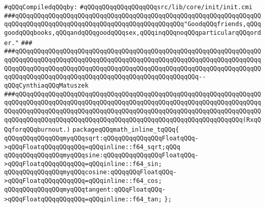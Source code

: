 \label{src/lib/core/init/math-built-in-intel32.pkg}
\newline
\verb|#qQQqCompiledqQQqby:|\newline
\verb|#qQQqqQQqqQQqqQQqqQQqsrc/lib/core/init/init.cmi|\newline
\newline
\newline
\newline
\verb|###qQQqqQQqqQQqqQQqqQQqqQQqqQQqqQQqqQQqqQQqqQQqqQQqqQQqqQQqqQQqqQQqqQQqqQQqqQQqqQQqqQQqqQQqqQQqqQQqqQQqqQQqqQQqqQQqqQQq"GoodqQQqfriends,qQQqgoodqQQqbooks,qQQqandqQQqgoodqQQqsex,qQQqinqQQqnoqQQqparticularqQQqorder."|\newline
\verb|###|\newline
\verb|###qQQqqQQqqQQqqQQqqQQqqQQqqQQqqQQqqQQqqQQqqQQqqQQqqQQqqQQqqQQqqQQqqQQqqQQqqQQqqQQqqQQqqQQqqQQqqQQqqQQqqQQqqQQqqQQqqQQqqQQqqQQqqQQqqQQqqQQqqQQqqQQqqQQqqQQqqQQqqQQqqQQqqQQqqQQqqQQqqQQqqQQqqQQqqQQqqQQqqQQqqQQqqQQqqQQqqQQqqQQqqQQqqQQqqQQqqQQqqQQqqQQqqQQqqQQqqQQqqQQq--qQQqCynthiaqQQqMatuszek|\newline
\verb|###qQQqqQQqqQQqqQQqqQQqqQQqqQQqqQQqqQQqqQQqqQQqqQQqqQQqqQQqqQQqqQQqqQQqqQQqqQQqqQQqqQQqqQQqqQQqqQQqqQQqqQQqqQQqqQQqqQQqqQQqqQQqqQQqqQQqqQQqqQQqqQQqqQQqqQQqqQQqqQQqqQQqqQQqqQQqqQQqqQQqqQQqqQQqqQQqqQQqqQQqqQQqqQQqqQQqqQQqqQQqqQQqqQQqqQQqqQQqqQQqqQQqqQQqqQQqqQQqqQQqqQQqqQQqqQQq(RxqQQqforqQQqburnout.)|\newline
\newline
\newline
\newline
\verb|packageqQQqmath_inline_tqQQq{|\newline
\newline
\verb|qQQqqQQqqQQqqQQqmyqQQqsqrt:qQQqqQQqqQQqqQQqFloatqQQq->qQQqFloatqQQqqQQqqQQq=qQQqinline::f64_sqrt;qQQq|\newline
\verb|qQQqqQQqqQQqqQQqmyqQQqsine:qQQqqQQqqQQqqQQqFloatqQQq->qQQqFloatqQQqqQQqqQQq=qQQqinline::f64_sin;|\newline
\verb|qQQqqQQqqQQqqQQqmyqQQqcosine:qQQqqQQqFloatqQQq->qQQqFloatqQQqqQQqqQQq=qQQqinline::f64_cos;|\newline
\verb|qQQqqQQqqQQqqQQqmyqQQqtangent:qQQqFloatqQQq->qQQqFloatqQQqqQQqqQQq=qQQqinline::f64_tan;|\newline
\verb|};|\newline

